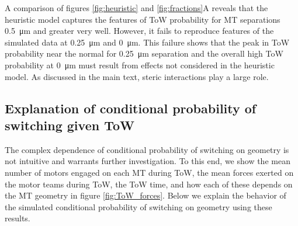 A comparison of figures \ref{fig:heuristic} and \ref{fig:fractions}A reveals that the heuristic model captures the features of ToW probability for MT separations \SI{.5}{\micro\meter} and greater very well. However, it fails to reproduce features of the simulated data at \SI{.25}{\micro\meter} and \SI{0}{\micro\meter}. This failure shows that the peak in ToW probability near the normal for \SI{.25}{\micro\meter} separation and the overall high ToW probability at \SI{0}{\micro\meter} must result from effects not considered in the heuristic model. As discussed in the main text, steric interactions play a large role.

\subsection{Explanation of conditional probability of switching given ToW}

The complex dependence of conditional probability of switching on geometry is not intuitive and warrants further investigation. To this end, we show the mean number of motors engaged on each MT during ToW, the mean forces exerted on the motor teams during ToW, the ToW time, and how each of these depends on the MT geometry in figure \ref{fig:ToW_forces}. Below we explain the behavior of the simulated conditional probability of switching on geometry using these results.

